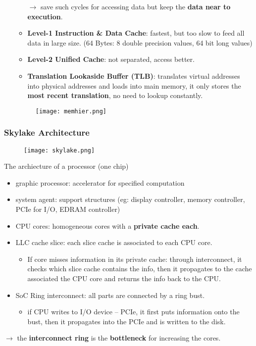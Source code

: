\begin{itemize}
\begin{itemize}
		$\rightarrow$ save such cycles for accessing data but keep the \textbf{data near to execution}.
		\item \textbf{Level-1 Instruction \& Data Cache}: fastest, but too slow to feed all data in large size. (64 Bytes: 8 double precision values, 64 bit long values)
		\item \textbf{Level-2 Unified Cache}: not separated, access better. 
		\item \textbf{Translation Lookaside Buffer (TLB)}: translates virtual addresses into physical addresses and loads into main memory, it only stores the \textbf{most recent translation}, no need to lookup constantly.
	\end{itemize}
	\begin{figure}[H]
		\centering
		\texttt{[image: memhier.png]}
	\end{figure}
\end{itemize}

\subsubsection{Skylake Architecture} 

\begin{figure}[H]
	\centering
	\texttt{[image: skylake.png]}
\end{figure}
The archiecture of a processor (one chip)
\begin{itemize}
	\item graphic processor: accelerator for specified computation
	\item system agent: support structures (eg: display controller, memory controller, PCIe for I/O, EDRAM controller)
	\item CPU cores: homogeneous cores with a \textbf{private cache each}.
	\item LLC cache slice: each slice cache is associated to each CPU core. 
	\begin{itemize}
		\item If core misses information in its private cache: through interconnect, it checks which slice cache contains the info, then it propagates to the cache associated the CPU core and returns the info back to the CPU.
	\end{itemize}
	
	\item SoC Ring interconnect: all parts are connected by a ring bust.
	\begin{itemize}
		\item if CPU writes to I/O device -- PCIe, it first puts information onto the bust, then it propagates into the PCIe and is written to the disk.
	\end{itemize}
\end{itemize}
$\rightarrow$ the \textbf{interconnect ring} is the \textbf{bottleneck} for increasing the cores.

